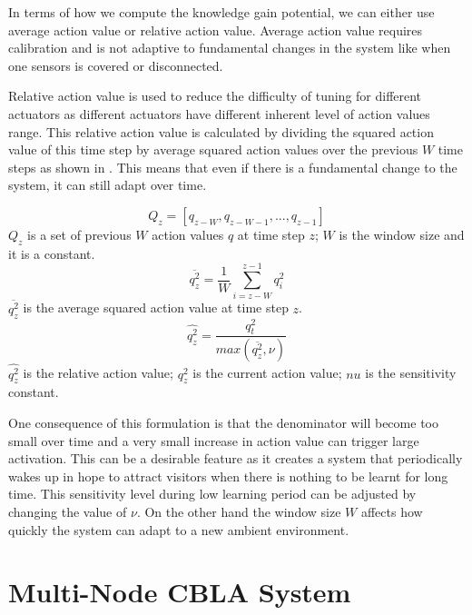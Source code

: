 In terms of how we compute the knowledge gain potential, we can either use average action value or relative action value. Average action value requires calibration and is not adaptive to fundamental changes in the system like when one sensors is covered or disconnected. 

Relative action value is used to reduce the difficulty of tuning for different actuators as different actuators have different inherent level of action values range. This relative action value is calculated by dividing the squared action value of this time step by average squared action values over the previous $W$ time steps as shown in . This means that even if there is a fundamental change to the system, it can still adapt over time.  

\begin{equation}\label{eqn:action_val_set}
	Q_z = [q_{z-W}, q_{z-W-1}, ... , q_{z-1}]
\end{equation}
$Q_z$ is a set of previous $W$ action values $q$ at time step $z$; $W$ is the window size and it is a constant.
\begin{equation}\label{eqn:avg_action_val}
	\overline{q^2_z} = \frac{1}{W}\displaystyle\sum_{i=z-W}^{z-1} q_i^2
\end{equation}
$\overline{q^2_z}$ is the average squared action value at time step $z$.
\begin{equation}\label{eqn:relative_action_val}
	\widehat{q^2_z} = \frac{q_t^2}{max(\overline{q^2_z}, \nu)}
\end{equation}
$\widehat{q^2_z}$ is the relative action value; $q_z^2$ is the current action value; $nu$ is the sensitivity constant.

One consequence of this formulation is that the denominator will become too small over time and a very small increase in action value can trigger large activation. This can be a desirable feature as it creates a system that periodically wakes up in hope to attract visitors when there is nothing to be learnt for long time. This sensitivity level during low learning period can be adjusted by changing the value of $\nu$. On the other hand the window size $W$ affects how quickly the system can adapt to a new ambient environment. 


\section{Multi-Node CBLA System}

